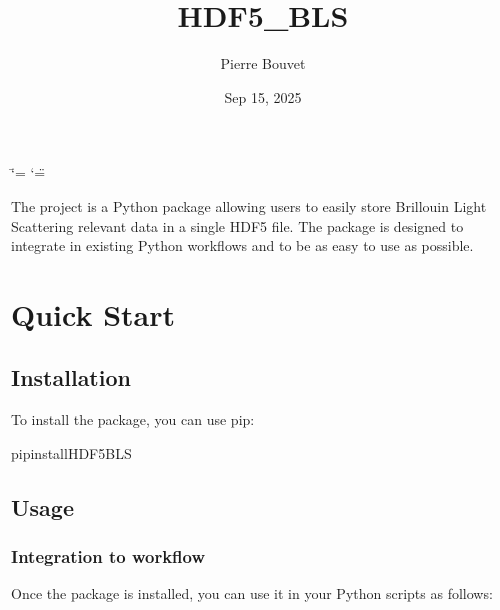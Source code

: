 \documentclass[letterpaper,10pt,english]{sphinxmanual}
\title{HDF5\_BLS}
\date{Sep 15, 2025}
\author{Pierre Bouvet}
\begin{document}
\ifdefined\shorthandoff
  \ifnum\catcode`\=\string=\active\shorthandoff{=}\fi
  \ifnum\catcode`\"=\active{}\fi
\fi

\pagestyle{empty}
\sphinxmaketitle
\pagestyle{plain}
\sphinxtableofcontents
\pagestyle{normal}
\label{\detokenize{index::doc}}


\sphinxAtStartPar
The  project is a Python package allowing users to easily store Brillouin Light Scattering relevant data in a single HDF5 file. The package is designed to integrate in existing Python workflows and to be as easy to use as possible.


\chapter{Quick Start}
\label{\detokenize{index:quick-start}}

\section{Installation}
\label{\detokenize{index:installation}}
\sphinxAtStartPar
To install the package, you can use pip:

\begin{sphinxVerbatim}[commandchars=\\\{\}]
pipinstallHDF5\PYGZus{}BLS
\end{sphinxVerbatim}


\section{Usage}
\label{\detokenize{index:usage}}

\subsection{Integration to workflow}
\label{\detokenize{index:integration-to-workflow}}
\sphinxAtStartPar
Once the package is installed, you can use it in your Python scripts as follows:
\end{document}
